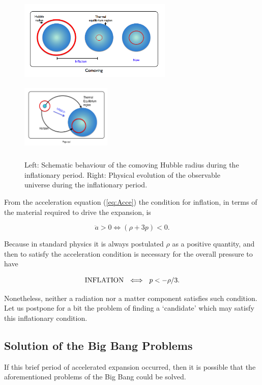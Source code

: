 \documentclass{rmaa}
\def\beq{\begin{equation}}
\def\eeq{\end{equation}}
\begin{document}
\begin{figure}[ht] 
\includegraphics[trim = 1mm  1mm 1mm 1mm, clip, width=7.3cm, height=4.2cm]{infla1.png}
\includegraphics[trim = 10mm  -10mm 1mm 10mm, clip, width=4.3cm, height=3.5cm]{pic2.png}
\caption{Left: Schematic behaviour 
of the comoving Hubble radius during the inflationary period. Right: 
Physical evolution of the observable universe during the inflationary period.}%
\label{fig:Liddle}
\end{figure}

From the acceleration equation (\ref{eq:Acce}) the condition for inflation, in 
terms of the material required to drive the expansion, is

\beq
\ddot a>0 \Longleftrightarrow (\rho +3p)<0.
\label{gg}
\eeq

\noindent
Because in standard physics it is always postulated $\rho$ as a positive quantity, and then
to satisfy the acceleration condition is necessary for the overall pressure to have 

\beq 
{\rm INFLATION} ~~ \Longleftrightarrow~~p<-\rho/3.
\eeq

\noindent
Nonetheless, neither a radiation nor a matter component satisfies such condition. 
Let us postpone for a bit the problem of finding a `candidate' which may satisfy this inflationary condition.



\subsection{Solution of the Big Bang Problems}
If this brief period of accelerated expansion occurred, then it is possible that the 
aforementioned problems of the Big Bang could be solved.
\\
\end{document}
